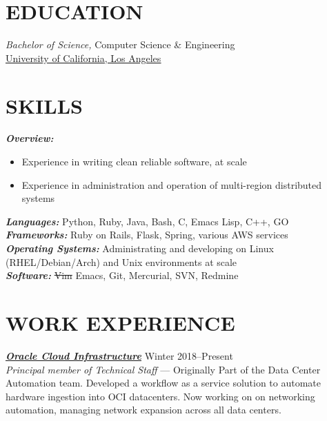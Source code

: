 \documentclass[line,letterpaper]{resume}
\begin{document}
\address{\ }
\address{\ }


\begin{resume}
    \vspace{-24pt}
    \section{\uppercase{Education}} {\sl Bachelor of Science,} \/
    Computer Science \& Engineering \\
    \underline{\href{http://cs.ucla.edu}{University of California, Los Angeles}}\\
    \vspace{-16pt}

 \section{\uppercase{Skills}}
    {\sl\textbf{Overview:}}\/
	\begin{itemize}
		\item Experience in writing clean reliable software, at scale
		\item Experience in administration and operation of multi-region distributed systems
	\end{itemize}
    {\sl\textbf{Languages:}}\/
    Python, Ruby, Java, Bash, C, Emacs Lisp, C++, GO \\
    {\sl\textbf{Frameworks:}}\/
	Ruby on Rails, Flask, Spring, various AWS services\\
    {\sl\textbf{Operating Systems:}}\/
	Administrating and developing on Linux (RHEL/Debian/Arch) and Unix environments at scale\\
    {\sl\textbf{Software:}}\/
	\sout{Vim} Emacs, Git, Mercurial, SVN, Redmine
    \vspace{-6pt}

	\section{\uppercase{Work Experience}}

	{\sl\textbf{\href{https://cloud.oracle.com/}{Oracle Cloud Infrastructure}}} \hfill Winter 2018--Present\\
    \emph{Principal member of Technical Staff } --- Originally Part of the Data
    Center Automation team. Developed a workflow as a service solution
    to automate hardware ingestion into OCI datacenters. Now working on
    on networking automation, managing network expansion across all data centers.


\end{resume}
\end{document}
